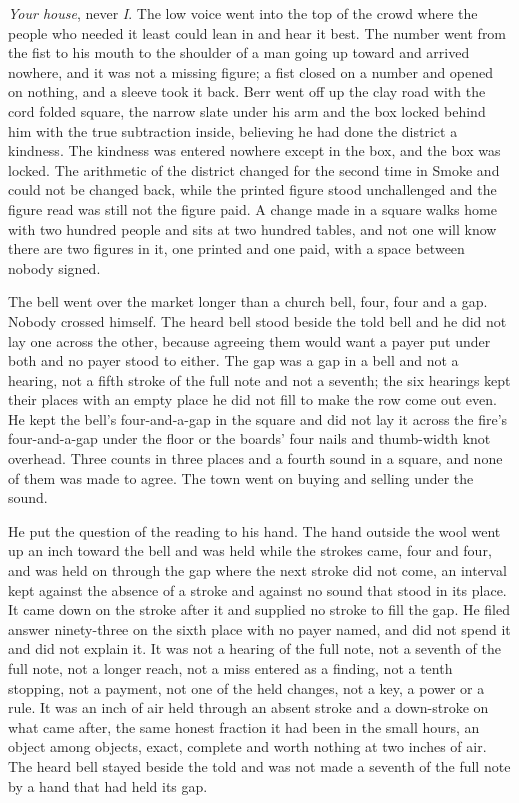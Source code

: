 \emph{Your house}, never \emph{I}. The low voice went into the top of the crowd where the people who needed it least could lean in and hear it best. The number went from the fist to his mouth to the shoulder of a man going up toward  and arrived nowhere, and it was not a missing figure; a fist closed on a number and opened on nothing, and a sleeve took it back. Berr went off up the clay road with the cord folded square, the narrow slate under his arm and the box locked behind him with the true subtraction inside, believing he had done the district a kindness. The kindness was entered nowhere except in the box, and the box was locked. The arithmetic of the district changed for the second time in Smoke and could not be changed back, while the printed figure stood unchallenged and the figure read was still not the figure paid. A change made in a square walks home with two hundred people and sits at two hundred tables, and not one will know there are two figures in it, one printed and one paid, with a space between nobody signed.

The bell went over the market longer than a church bell, four, four and a gap. Nobody crossed himself. The heard bell stood beside the told bell and he did not lay one across the other, because agreeing them would want a payer put under both and no payer stood to either. The gap was a gap in a bell and not a hearing, not a fifth stroke of the full note and not a seventh; the six hearings kept their places with an empty place he did not fill to make the row come out even. He kept the bell's four-and-a-gap in the square and did not lay it across the fire's four-and-a-gap under the floor or the boards' four nails and thumb-width knot overhead. Three counts in three places and a fourth sound in a square, and none of them was made to agree. The town went on buying and selling under the sound.

He put the question of the reading to his hand. The hand outside the wool went up an inch toward the bell and was held while the strokes came, four and four, and was held on through the gap where the next stroke did not come, an interval kept against the absence of a stroke and against no sound that stood in its place. It came down on the stroke after it and supplied no stroke to fill the gap. He filed answer ninety-three on the sixth place with no payer named, and did not spend it and did not explain it. It was not a hearing of the full note, not a seventh of the full note, not a longer reach, not a miss entered as a finding, not a tenth stopping, not a payment, not one of the held changes, not a key, a power or a rule. It was an inch of air held through an absent stroke and a down-stroke on what came after, the same honest fraction it had been in the small hours, an object among objects, exact, complete and worth nothing at two inches of air. The heard bell stayed beside the told and was not made a seventh of the full note by a hand that had held its gap.


